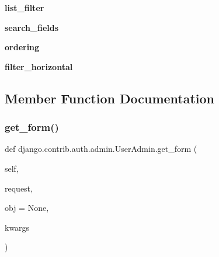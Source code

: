 \begin{DoxyCompactItemize}
\mbox{\label{classdjango_1_1contrib_1_1auth_1_1admin_1_1_user_admin_aac17168968455dac6f146b6a64ff1614}} 
{\bfseries list\+\_\+filter}
\item 
\mbox{\label{classdjango_1_1contrib_1_1auth_1_1admin_1_1_user_admin_a5593155e0c8d06bfbb889250cfc4d875}} 
{\bfseries search\+\_\+fields}
\item 
\mbox{\label{classdjango_1_1contrib_1_1auth_1_1admin_1_1_user_admin_a2b6c5a09b60c4c10d67562118d00b4c0}} 
{\bfseries ordering}
\item 
\mbox{\label{classdjango_1_1contrib_1_1auth_1_1admin_1_1_user_admin_a5248b3a57f4c70df07af935e92673506}} 
{\bfseries filter\+\_\+horizontal}
\end{DoxyCompactItemize}


\subsection{Member Function Documentation}
\mbox{\label{classdjango_1_1contrib_1_1auth_1_1admin_1_1_user_admin_aeae77e3695f8ca0e33cc6d470fb33f3e}} 
\subsubsection{\texorpdfstring{get\+\_\+form()}{get\_form()}}
{\footnotesize\ttfamily def django.\+contrib.\+auth.\+admin.\+User\+Admin.\+get\+\_\+form (\begin{DoxyParamCaption}\item[{}]{self,  }\item[{}]{request,  }\item[{}]{obj = {\ttfamily None},  }\item[{}]{kwargs }\end{DoxyParamCaption})}

